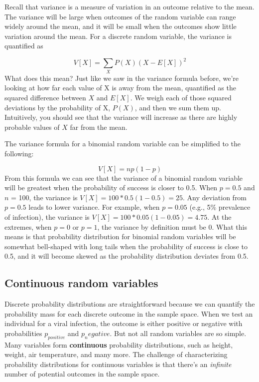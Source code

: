 \documentclass[
]{book}
\begin{document}
Recall that variance is a measure of variation in an outcome relative to the mean. The variance will be large when outcomes of the random variable can range widely around the mean, and it will be small when the outcomes show little variation around the mean. For a discrete random variable, the variance is quantified as

\[
V[X]=\sum_{X}P(X)(X-E[X])^2
\]
What does this mean? Just like we saw in the variance formula before, we're looking at how far each value of X is away from the mean, quantified as the squared difference between \(X\) and \(E[X]\). We weigh each of those squared deviations by the probability of X, \(P(X)\), and then we sum them up. Intuitively, you should see that the variance will increase as there are highly probable values of \(X\) far from the mean.

The variance formula for a binomial random variable can be simplified to the following:

\[
V[X]=np(1-p)
\]
From this formula we can see that the variance of a binomial random variable will be greatest when the probability of success is closer to 0.5. When \(p=0.5\) and \(n\) = 100, the variance is \(V[X]=100*0.5(1-0.5)=25\). Any deviation from \(p = 0.5\) leads to lower variance. For example, when \(p=0.05\) (e.g., 5\% prevalence of infection), the variance is \(V[X]=100*0.05(1-0.05)=4.75\). At the extremes, when \(p = 0\) or \(p = 1\), the variance by definition must be 0. What this means is that probability distribution for binomial random variables will be somewhat bell-shaped with long tails when the probability of success is close to 0.5, and it will become skewed as the probability distribution deviates from 0.5.

\subsection{Continuous random variables}\label{continuous-random-variables}

Discrete probability distributions are straightforward because we can quantify the probability mass for each discrete outcome in the sample space. When we test an individual for a viral infection, the outcome is either positive or negative with probabilities \(p_{positive}\) and \(p_negative\). But not all random variables are so simple. Many variables form \textbf{continuous} probability distributions, such as height, weight, air temperature, and many more. The challenge of characterizing probability distributions for continuous variables is that there's an \emph{infinite} number of potential outcomes in the sample space.
\end{document}
